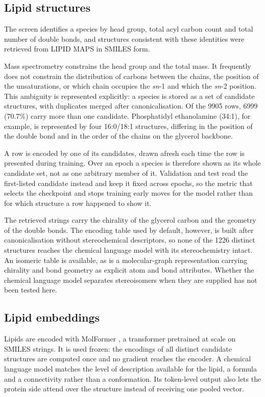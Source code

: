 \subsection{Lipid structures}

The screen identifies a species by head group, total acyl carbon count and total number of double
bonds, and structures consistent with these identities were retrieved from LIPID MAPS
\cite{lipidmaps} in SMILES form.

Mass spectrometry constrains the head group and the total mass. It frequently does not constrain
the distribution of carbons between the chains, the position of the unsaturations, or which chain
occupies the \emph{sn}-1 and which the \emph{sn}-2 position. This ambiguity is represented
explicitly: a species is stored as a set of candidate structures, with duplicates merged after
canonicalisation. Of the 9905 rows, 6999 (70.7\%) carry more than one candidate. Phosphatidyl\-
ethanolamine (34:1), for example, is represented by four 16:0/18:1 structures, differing in the
position of the double bond and in the order of the chains on the glycerol backbone.

A row is encoded by one of its candidates, drawn afresh each time the row is presented during
training. Over an epoch a species is therefore shown as its whole candidate set, not as one
arbitrary member of it. Validation and test read the first-listed candidate instead and keep it
fixed across epochs, so the metric that selects the checkpoint and stops training early moves for
the model rather than for which structure a row happened to show it.

The retrieved strings carry the chirality of the glycerol carbon and the geometry of the double
bonds. The encoding table used by default, however, is built after canonicalisation without
stereochemical descriptors, so none of the 1226 distinct structures reaches the chemical language
model with its stereochemistry intact. An isomeric table is available, as is a molecular-graph
representation carrying chirality and bond geometry as explicit atom and bond attributes. Whether
the chemical language model separates stereoisomers when they are supplied has not been tested
here.

\subsection{Lipid embeddings}

Lipids are encoded with MolFormer \cite{molformer}, a transformer pretrained at scale on SMILES
strings. It is used frozen: the encodings of all distinct candidate structures are computed once
and no gradient reaches the encoder. A chemical language model matches the level of description
available for the lipid, a formula and a connectivity rather than a conformation. Its token-level
output also lets the protein side attend over the structure instead of receiving one pooled
vector.

